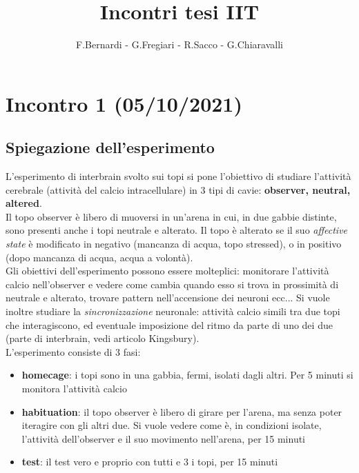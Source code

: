 \documentclass[a4paper]{article}
\title{Incontri tesi IIT}
\author{F.Bernardi - G.Fregiari - R.Sacco - G.Chiaravalli}
\begin{document}
		\maketitle
	\clearpage
	
	\clearpage
	
	\section{Incontro 1 (05/10/2021)}
	
	\subsection{Spiegazione dell'esperimento}
	
	L'esperimento di interbrain svolto sui topi si pone l'obiettivo di studiare l'attività cerebrale (attività del calcio intracellulare) in 3 tipi di cavie: \textbf{observer, neutral, altered}.\\
	Il topo observer è libero di muoversi in un'arena in cui, in due gabbie distinte, sono presenti anche i topi neutrale e alterato. Il topo è alterato se il suo \textit{affective state} è modificato in negativo (mancanza di acqua, topo stressed), o in positivo (dopo mancanza di acqua, acqua a volontà). \\
	 Gli obiettivi dell'esperimento possono essere molteplici: monitorare l'attività calcio nell'observer e vedere come cambia quando esso si trova in prossimità di neutrale e alterato, trovare pattern nell'accensione dei neuroni ecc... Si vuole inoltre studiare la \textit{sincronizzazione} neuronale: attività calcio simili tra due topi che interagiscono, ed eventuale imposizione del ritmo da parte di uno dei due (parte di interbrain, vedi articolo Kingsbury). \\
	L'esperimento consiste di 3 fasi:
	\begin{itemize}
		\item \textbf{homecage}: i topi sono in una gabbia, fermi, isolati dagli altri. Per 5 minuti si monitora l'attività calcio
		
		\item \textbf{habituation}: il topo observer è libero di girare per l'arena, ma senza poter iteragire con gli altri due. Si vuole vedere come è, in condizioni isolate, l'attività dell'observer e il suo movimento nell'arena, per 15 minuti
		
		\item \textbf{test}: il test vero e proprio con tutti e 3 i topi, per 15 minuti
		
	\end{itemize}
	
\end{document}
